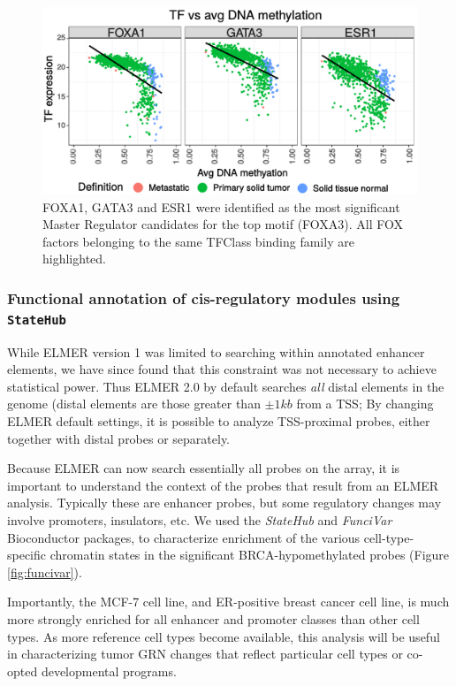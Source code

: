\begin{figure}
\centering
\includegraphics[width=1.0\textwidth]{images/scatter_font.pdf}
\caption[FOXA1, GATA3 and ESR1 expression vs average DNA methylation at probes with FOXA3 motif]{\label{fig:scatter} FOXA1, GATA3 and ESR1 were identified as the most significant Master Regulator candidates for the top motif (FOXA3). All FOX factors belonging to the same TFClass binding family are highlighted.}
\end{figure}


\subsubsection*{Functional annotation of cis-regulatory modules using \texttt{StateHub}}
While ELMER version 1 was limited to searching within annotated enhancer elements, we have since found that this constraint was not necessary to achieve statistical power. Thus ELMER 2.0 by default searches \textit{all} distal elements in the genome (distal elements are those greater than $\pm1 kb$ from a TSS; By changing ELMER default settings, it is possible to analyze TSS-proximal probes, either together with distal probes or separately.

Because ELMER can now search essentially all probes on the array, it is important to understand the context of the probes that result from an ELMER analysis. Typically these are enhancer probes, but some regulatory changes may involve promoters, insulators, etc. We used the \textit{StateHub} \cite{statepaintr} and \textit{FunciVar} Bioconductor packages, to characterize enrichment of the various cell-type-specific chromatin states in the significant BRCA-hypomethylated probes (Figure \ref{fig:funcivar}).

 Importantly, the MCF-7 cell line, and ER-positive breast cancer cell line, is much more strongly enriched for all enhancer and promoter classes than other cell types. As more reference cell types become available, this analysis will be useful in characterizing tumor GRN changes that reflect particular cell types or co-opted developmental programs.

